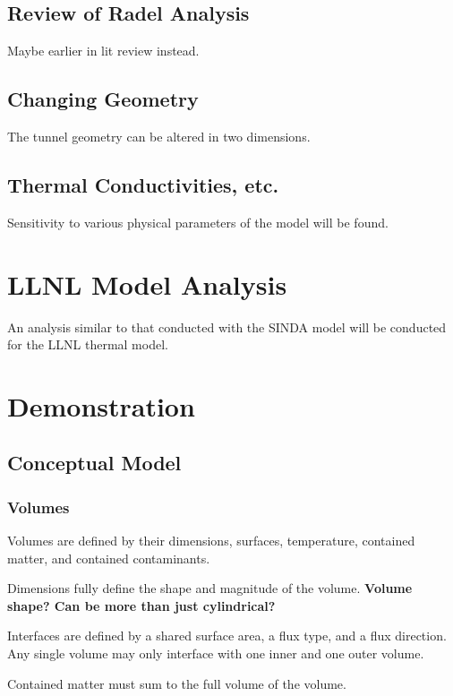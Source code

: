 \subsection{Review of Radel Analysis}

Maybe earlier in lit review instead. 

\subsection{Changing Geometry}

The tunnel geometry can be altered in two dimensions.

\subsection{Thermal Conductivities, etc.}

Sensitivity to various physical parameters of the model will be found. 

\section{LLNL Model Analysis}

An analysis similar to that conducted with the SINDA model will be conducted 
for the LLNL thermal model.

\section{Demonstration}

\subsection{Conceptual Model}

\subsubsection{Volumes}

Volumes are defined by their dimensions, surfaces, temperature, contained matter, and 
contained contaminants. 

Dimensions fully define the shape and magnitude of the volume.
\textbf{Volume shape? Can be more than just cylindrical?}

Interfaces are defined by a shared surface area, a flux type, and a flux 
direction. Any single volume may only interface with one inner and one outer 
volume. 

Contained matter must sum to the full volume of the volume.

